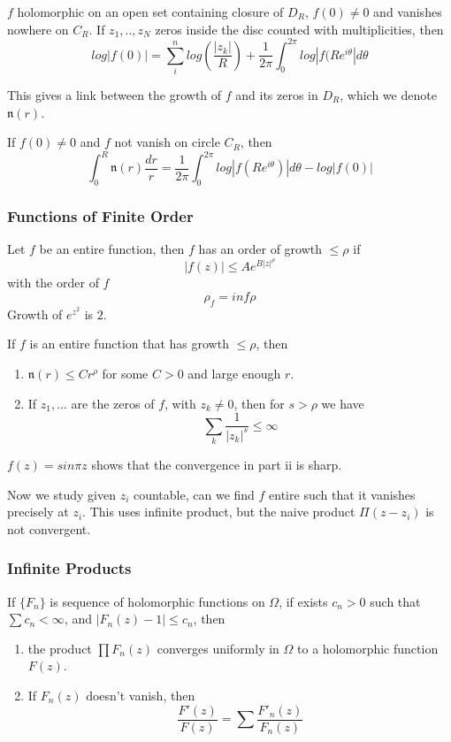 \documentclass[main.tex]{subfiles}
\begin{document}
\begin{theorem}
$f$ holomorphic on an open set containing closure of $D_R$, $f(0) \neq 0$ and vanishes nowhere on $C_R$. If $z_1, .. , z_N$ zeros inside the disc counted with multiplicities, then
$$
log |f(0)| = \sum_i ^n log(\frac{|z_k|}{R}) + \frac{1}{2\pi} \int_0 ^{2\pi} log |f (R e^{i\theta} | d\theta
$$
\end{theorem}

This gives a link between the growth of $f$ and its zeros in $D_R$, which we denote $\mathfrak{n}(r)$.

If $f(0) \neq 0$ and $f$ not vanish on circle $C_R$, then
$$
\int_0 ^R \mathfrak{n}(r) \frac{dr}{r} = \frac{1}{2\pi} \int_0 ^{2 \pi} log |f(Re^{i\theta})| d\theta - log|f(0)|
$$

\subsubsection{Functions of Finite Order}
Let $f$ be an entire function, then $f$ has an order of growth $\leq \rho$ if 
$$
|f(z)| \leq A e^{B |z|^{\rho}}
$$
with the order of $f$ 
$$
\rho_f = inf \rho
$$
Growth of $e^{z^2}$ is $2$.

\begin{theorem}
If $f$ is an entire function that has growth $\leq \rho$, then 
\begin{enumerate}
    \item $\mathfrak{n}(r) \leq C r^\rho$ for some $C > 0$ and large enough $r$.
    \item If $z_1, ...$ are the zeros of $f$, with $z_k \neq 0$, then for $s > \rho$ we have 
    $$
    \sum_k \frac{1}{|z_k|^s} \leq \infty
    $$
\end{enumerate}
\end{theorem}

$f(z) = sin \pi z$ shows that the convergence in part ii is sharp. 

Now we study given $z_i$ countable, can we find $f$ entire such that it vanishes precisely at $z_i$. This uses infinite product, but the naive product $\Pi(z - z_i)$ is not convergent.

\subsubsection{Infinite Products}

\begin{proposition}
If $\{F_n\}$ is sequence of holomorphic functions on $\Omega$, if exists $c_n > 0$ such that 
$\sum c_n < \infty$, and $|F_n(z) - 1| \leq c_n$, then 
\begin{enumerate}
    \item the product $\prod F_n(z)$ converges uniformly in $\Omega$ to a holomorphic function $F(z)$.
    \item If $F_n(z)$ doesn't vanish, then
    $$
    \frac{F'(z)}{F(z)} = \sum     \frac{F'_n(z)}{F_n(z)}
    $$
\end{enumerate}
\end{proposition}
\end{document}
